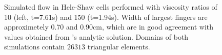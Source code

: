 \begin{landscape}
\begin{figure}[ht]
\caption{Simulated flow in Hele-Shaw cells performed with viscosity ratios of 10 (left, t=7.61s) and 150 (t=1.94s). Width of largest fingers are approximetely 0.70 and 0.90cm, which are in good agreement with values obtained from \citet{guan_2003}'s analytic solution. Domains of both simulations contain $26313$  triangular elements.}
\label{fig:homoheleshaw_VN10_VN150}
\end{figure}
\end{landscape}

